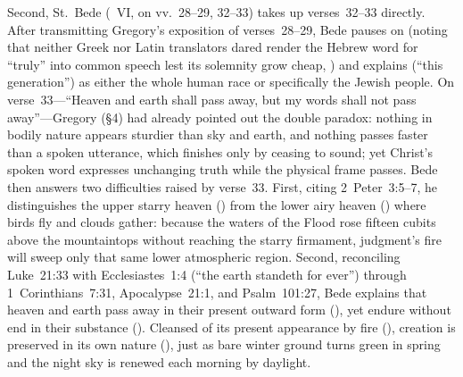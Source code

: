 Second, St.~Bede (~VI, on vv.~28--29, 32--33) takes up verses~32--33 directly. After transmitting Gregory's exposition of verses~28--29, Bede pauses on  (noting that neither Greek nor Latin translators dared render the Hebrew word for ``truly'' into common speech lest its solemnity grow cheap, ) and explains  (``this generation'') as either the whole human race or specifically the Jewish people. On verse~33---``Heaven and earth shall pass away, but my words shall not pass away''---Gregory (\S4) had already pointed out the double paradox: nothing in bodily nature appears sturdier than sky and earth, and nothing passes faster than a spoken utterance, which finishes only by ceasing to sound; yet Christ's spoken word expresses unchanging truth while the physical frame passes. Bede then answers two difficulties raised by verse~33. First, citing 2~Peter~3:5--7, he distinguishes the upper starry heaven () from the lower airy heaven () where birds fly and clouds gather: because the waters of the Flood rose fifteen cubits above the mountaintops without reaching the starry firmament, judgment's fire will sweep only that same lower atmospheric region. Second, reconciling Luke~21:33 with Ecclesiastes~1:4 (``the earth standeth for ever'') through 1~Corinthians~7:31, Apocalypse~21:1, and Psalm~101:27, Bede explains that heaven and earth pass away in their present outward form (), yet endure without end in their substance (). Cleansed of its present appearance by fire (), creation is preserved in its own nature (), just as bare winter ground turns green in spring and the night sky is renewed each morning by daylight.

